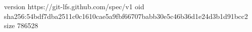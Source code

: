version https://git-lfs.github.com/spec/v1
oid sha256:54bdf7dba2511c0c1610cae5a9fbf66707babb30e5c46b36d1e24d3b1d91bcc2
size 786528
